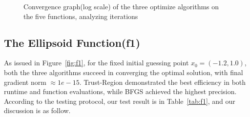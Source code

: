 \documentclass[12pt]{article}
\begin{document}
\begin{figure}[ht]
\centering
{}
\caption[]{Convergence graph(log scale) of the three optimize algorithms on the five functions, analyzing iterations}
\label{fig:convgraph}
\end{figure}

\subsection{The Ellipsoid Function(f1)}

As issued in Figure~\ref{fig:f1}, for the fixed initial guessing point $x_0=(-1.2,1.0)$, both the three algorithms succeed in converging the optimal solution, with final gradient norm $\approx1e-15$. Trust-Region demonstrated the best efficiency in both runtime and function evaluations, while BFGS achieved the highest precision. According to the testing protocol, our test result is in Table~\ref{tab:f1}, and our discussion is as follow.
\end{document}
